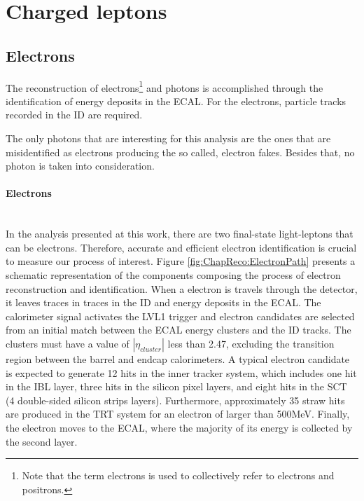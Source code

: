 \section{Charged leptons}
\subsection{Electrons}
\label{sec:Chap3:Reco:ElectronsAndPhotons}

The reconstruction of electrons\footnote{Note that the term electrons is used to 
collectively refer to electrons and positrons.} and photons is accomplished through 
the identification of energy deposits in the ECAL.
For the electrons, particle tracks recorded in the ID are required.

The only photons that are interesting for this analysis are the ones that 
are misidentified as electrons producing the so called, electron fakes.
 Besides that, no photon is taken into consideration.

\paragraph{Electrons}\mbox{}\\
In the analysis presented at this work, there are two final-state light-leptons 
that can be electrons. Therefore, accurate and efficient electron identification 
is crucial to measure our process of interest.
 Figure \ref{fig:ChapReco:ElectronPath} presents 
a schematic representation of the components composing the process 
of electron reconstruction and identification.
When a electron is travels through the detector, it leaves traces in traces in the ID
and energy deposits in the ECAL. The calorimeter signal activates the LVL1 trigger
and electron candidates are selected from an initial match between the ECAL energy
clusters and the ID tracks. The clusters must have a value of $|\eta_{cluster}|$ less than 2.47, 
excluding the transition region between the barrel and endcap calorimeters. 
A typical electron candidate is expected to generate 12 hits in the inner tracker system, 
which includes one hit in the IBL layer, three hits in the silicon pixel layers, and 
eight hits in the SCT (4 double-sided silicon strips layers).
Furthermore, approximately 35 straw hits are produced in the TRT system for an electron
of \pT larger than 500\;MeV. Finally, the electron moves to the ECAL, where the majority
of its energy is collected by the second layer.

